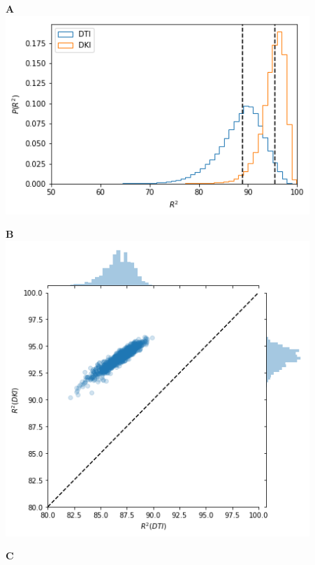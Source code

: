 \documentclass[a0, landscape]{a0poster}
\begin{document}
\begin{multicols}{3}
\begin{minipage}[b]{1\linewidth}
  \large
  \begin{minipage}[b]{0.33\linewidth}
  \textbf{A}\\
  \includegraphics[width=11.5cm]{histogram_cod_dki_dti.png}
  \end{minipage}
  \begin{minipage}[b]{0.33\linewidth}
  \textbf{B}\\
  \includegraphics[width=11.5cm]{cod_dti_dki.png}
  \end{minipage}
  \begin{minipage}[b]{0.33\linewidth}
  \textbf{C}\\

\end{minipage}
\end{minipage}
\end{multicols}
\end{document}
